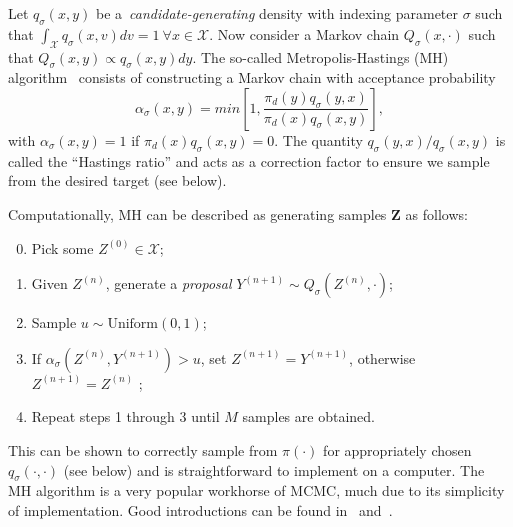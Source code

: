 Let $q_\sigma(x, y)$ be a~\textit{candidate-generating} density with indexing parameter %
$\sigma$ such that $\int_{\mathcal{X}} q_\sigma(x, v) dv = 1 \: \forall x \in \mathcal{X}$. 
Now consider a Markov chain $Q_\sigma(x, \cdot)$ such that $Q_\sigma(x, y) \propto q_\sigma(x, y) dy$.
The so-called Metropolis-Hastings (MH) algorithm~\citep{Metropolis1953,Hastings1970} consists of constructing a Markov chain with acceptance probability
\begin{equation}
 \label{eq:acceptance}
 \alpha_\sigma(x, y) = min \left[1, \frac{\pi_d(y) q_\sigma(y, x)}{\pi_d(x) q_\sigma(x, y)} \right],
\end{equation}
with $\alpha_\sigma(x, y) = 1$ if $\pi_d(x) q_\sigma(x, y) = 0$.
The quantity $q_\sigma(y, x)/ q_\sigma(x, y)$ is called the ``Hastings ratio'' and acts as a correction factor to ensure we sample from the desired target (see below).

Computationally, MH can be described as generating samples $\boldsymbol Z$ as follows:
\begin{enumerate}
 \setcounter{enumi}{-1}
 \item Pick some $Z^{(0)} \in \mathcal{X}$;
 \item Given $Z^{(n)}$, generate a \textit{proposal} $Y^{(n + 1)} \sim Q_\sigma(Z^{(n)}, \cdot)$;
 \item Sample $u \sim \text{Uniform}(0, 1)$;
 \item If $\alpha_\sigma(Z^{(n)},  Y^{(n + 1)}) > u$, set $Z^{(n + 1)} = Y^{(n + 1)}$, otherwise $Z^{(n + 1)} = Z^{(n)}$ ;
 \item Repeat steps 1 through 3 until $M$ samples are obtained.
\end{enumerate}
This can be shown to correctly sample from $\pi(\cdot)$ for appropriately chosen $q_\sigma(\cdot, \cdot)$ (see below) and is straightforward to implement on a computer.
The MH algorithm is a very popular workhorse of MCMC, much due to its simplicity of implementation.
Good introductions can be found in~\cite{Chib1995} and~\cite{Robert2015}.

